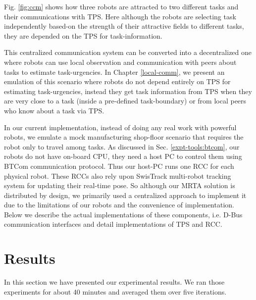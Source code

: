 \documentclass[preprint,12pt]{elsarticle}
\begin{document}
Fig. \ref{fig:ccm} shows how three robots are attracted to two different tasks and their communications with TPS. Here although the robots are selecting task independently based-on the strength of their attractive fields to different tasks, they are depended on the TPS for task-information.

This centralized communication system can be converted into a decentralized one where robots can use local observation and communication with peers about tasks to estimate task-urgencies. In Chapter \ref{local-comm}, we present an emulation of this scenario where robots do not depend entirely on TPS for estimating task-urgencies, instead they get task information from TPS when they are very close to a task (inside a pre-defined task-boundary) or from local peers who know about a task via TPS.

In our current implementation, instead of doing any real work with powerful robots, we emulate a mock manufacturing shop-floor scenario that requires the robot only to travel among tasks. As discussed in Sec. \ref{expt-tools:btcom}, our robots do not have on-board CPU, they need a host PC to  control them using BTCom communication protocol. Thus our host-PC  runs one RCC for each physical robot. These RCCs also rely upon SwisTrack multi-robot tracking system for updating their real-time pose. So although our MRTA solution is distributed by design, we primarily used a centralized approach to implement it due to the limitations of our robots and the convenience of implementation. Below we describe the actual implementations of these components, i.e. D-Bus communication interfaces and detail implementations of TPS and RCC.
\section{Results}
\label{sec:res}
In this section we have presented our experimental results. We ran those experiments for about 40 minutes and averaged them over five iterations. 
\end{document}
